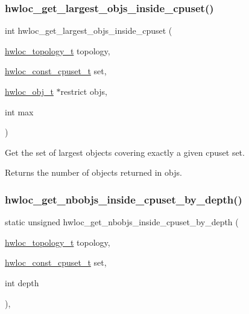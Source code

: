 \subsubsection{\texorpdfstring{hwloc\+\_\+get\+\_\+largest\+\_\+objs\+\_\+inside\+\_\+cpuset()}{hwloc\_get\_largest\_objs\_inside\_cpuset()}}
{\footnotesize\ttfamily int hwloc\+\_\+get\+\_\+largest\+\_\+objs\+\_\+inside\+\_\+cpuset (\begin{DoxyParamCaption}\item[{\hyperlink{a00186_ga9d1e76ee15a7dee158b786c30b6a6e38}{hwloc\+\_\+topology\+\_\+t}}]{topology,  }\item[{\hyperlink{a00183_ga1f784433e9b606261f62d1134f6a3b25}{hwloc\+\_\+const\+\_\+cpuset\+\_\+t}}]{set,  }\item[{\hyperlink{a00185_ga79b8ab56877ef99ac59b833203391c7d}{hwloc\+\_\+obj\+\_\+t} $\ast$restrict}]{objs,  }\item[{int}]{max }\end{DoxyParamCaption})}



Get the set of largest objects covering exactly a given cpuset {\ttfamily set}. 

\begin{DoxyReturn}{Returns}
the number of objects returned in {\ttfamily objs}. 
\end{DoxyReturn}
\mbox{\label{a00195_gaa43c64512ddb33fd181990c4261cec7d}} 
\subsubsection{\texorpdfstring{hwloc\+\_\+get\+\_\+nbobjs\+\_\+inside\+\_\+cpuset\+\_\+by\+\_\+depth()}{hwloc\_get\_nbobjs\_inside\_cpuset\_by\_depth()}}
{\footnotesize\ttfamily static unsigned hwloc\+\_\+get\+\_\+nbobjs\+\_\+inside\+\_\+cpuset\+\_\+by\+\_\+depth (\begin{DoxyParamCaption}\item[{\hyperlink{a00186_ga9d1e76ee15a7dee158b786c30b6a6e38}{hwloc\+\_\+topology\+\_\+t}}]{topology,  }\item[{\hyperlink{a00183_ga1f784433e9b606261f62d1134f6a3b25}{hwloc\+\_\+const\+\_\+cpuset\+\_\+t}}]{set,  }\item[{int}]{depth }\end{DoxyParamCaption})\hspace{0.3cm}{\ttfamily [inline]}, {\ttfamily [static]}}



